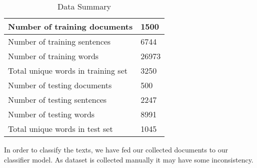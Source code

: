  \renewcommand{\arraystretch}{1.3}
\begin{table}[h!]
\begin{center}
\caption{Data Summary}
\begin{tabular}{||m{5.8cm} || m{2cm}||}
\hline
     Number of training documents & 1500 \\
\hline
    Number of training sentences & 6744\\
\hline
    Number of training words & 26973\\
\hline
    Total unique words in training set & 3250\\
\hline
\hline
     Number of testing documents & 500 \\
\hline
     Number of testing sentences & 2247\\
\hline 
     Number of testing words & 8991\\
\hline 
     Total unique words in test set & 1045\\
\hline
\end{tabular}
\label{data}
\end{center}
\end{table}
In order to classify the texts, we have fed our collected documents to our classifier model. As dataset is collected manually it may have some inconsistency.
